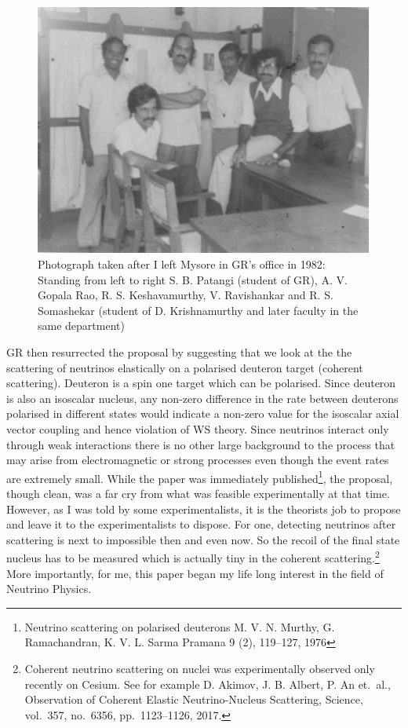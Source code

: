 \begin{figure}[H]
\centering
\includegraphics[scale=.87]{src/images/chap14/002.jpg}
\caption{Photograph taken after I left Mysore in GR’s office in 1982: Standing from left to right S. B. Patangi (student of GR), A. V. Gopala Rao, R. S. Keshavamurthy, V. Ravishankar and R. S. Somashekar (student of D. Krishnamurthy and later faculty in the same department)}\label{chap14-fig002}
\end{figure}


GR then resurrected the proposal by suggesting that we look at the the scattering of neutrinos elastically on a polarised deuteron target (coherent scattering). Deuteron is a spin one target which can be polarised. Since deuteron is also an isoscalar nucleus, any non-zero difference in the rate between deuterons polarised in different states would indicate a non-zero value for the isoscalar axial vector coupling and hence violation of WS theory. Since neutrinos interact only through weak interactions there is no other large background to the process that may arise from electromagnetic or strong processes even though the event rates are extremely small. While the paper was immediately published\footnote{Neutrino scattering on polarised deuterons M. V. N. Murthy, G. Ramachandran, K. V. L. Sarma Pramana 9 (2), 119--127, 1976}, the proposal, though clean, was a far cry from what was feasible experimentally at that time. However, as I was told by some experimentalists, it is the theorists job to propose and leave it to the experimentalists to dispose. For one, detecting neutrinos after scattering is next to impossible then and even now. So the recoil of the final state nucleus has to be measured which is actually tiny in the coherent scattering.\footnote{Coherent neutrino scattering on nuclei was experimentally observed only recently on Cesium. See for example D. Akimov, J. B. Albert, P. An et.\ al., Observation of Coherent Elastic Neutrino-Nucleus Scattering, Science, vol.\ 357, no.\ 6356, pp.\ 1123--1126, 2017.} More importantly, for me, this paper began my life long interest in the field of Neutrino Physics.

